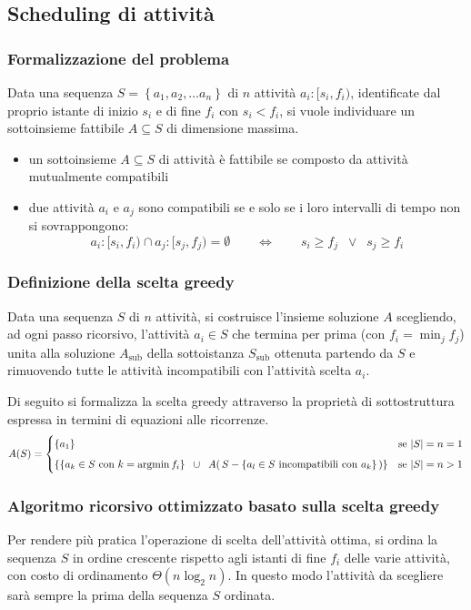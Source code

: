 \subsection{Scheduling di attività}
\subsubsection*{Formalizzazione del problema}
Data una sequenza \(S=\left\{ a_1, a_2, \dots a_n \right\}\) di \(n\) attività \(a_i : [s_i, f_i)\), identificate dal proprio
istante di inizio \(s_i\) e di fine \(f_i\) con \(s_i < f_i\), si vuole individuare un sottoinsieme fattibile
\(A \subseteq S\) di dimensione massima.

\begin{itemize}[topsep=5pt]
	\item un sottoinsieme \(A \subseteq S\) di attività è fattibile se composto da attività mutualmente compatibili
	\item due attività \(a_i\) e \(a_j\) sono compatibili se e solo se i loro intervalli di tempo non si sovrappongono:
	\vspace{-5pt}
	\[a_i : [s_i, f_i) \cap a_j : [s_j, f_j) = \emptyset \qquad \Longleftrightarrow \qquad s_i \geq f_j \;\; \vee \;\; s_j \geq f_i\]
\end{itemize}

\subsubsection*{Definizione della scelta greedy}
Data una sequenza \(S\) di \(n\) attività, si costruisce l'insieme soluzione \(A\) scegliendo, ad ogni passo ricorsivo,
l'attività \(a_i \in S\) che termina per prima (con \(f_i = \min_j f_j\)) unita alla soluzione \(A_\text{sub}\)
della sottoistanza \(S_\text{sub}\) ottenuta partendo da \(S\) e rimuovendo tutte le attività incompatibili con
l'attività scelta \(a_i\).

Di seguito si formalizza la scelta greedy attraverso la proprietà di sottostruttura espressa in termini di equazioni alle
ricorrenze.
\[A(S) = \begin{cases}
	\left\{ a_1 \right\} & \text{se } |S| = n = 1 \\[5pt]
	\displaystyle \left\{ \left\{ a_k \in S \text{ con } k = \operatorname*{argmin} f_i \right\} \;\; \cup \;\; A( \, S - \left\{ a_l \in S \text{ incompatibili con } a_k \right\} \,) \right\} & \text{se } |S| = n > 1
\end{cases}\]

\subsubsection*{Algoritmo ricorsivo ottimizzato basato sulla scelta greedy}
Per rendere più pratica l'operazione di scelta dell'attività ottima, si ordina la sequenza \(S\) in ordine crescente rispetto
agli istanti di fine \(f_i\) delle varie attività, con costo di ordinamento \(\Theta(n \log_2 n)\). In questo modo l'attività
da scegliere sarà sempre la prima della sequenza \(S\) ordinata.

